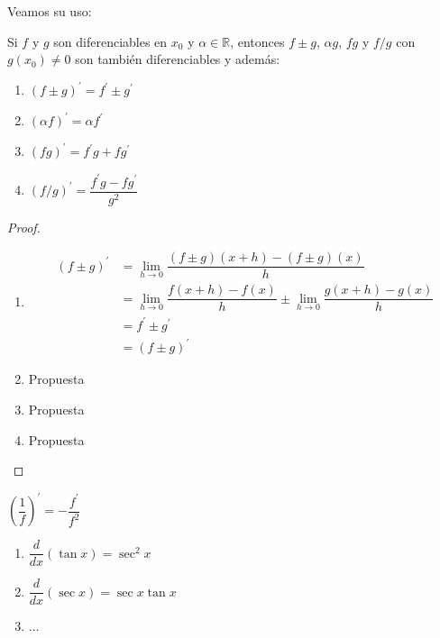 Veamos su uso:

\begin{thm}
    Si $f$ y $g$ son diferenciables en $x_0$ y $\alpha \in \mathbb{R}$, entonces $f \pm g$, $\alpha g$, $fg$ y $f/g$ con $g(x_0) \neq 0$ son también diferenciables y además:

    \begin{enumerate}
        \item $(f \pm g)^\prime = f^\prime \pm g^\prime$
        \item $(\alpha f)^\prime = \alpha f^\prime$
        \item $(fg)^\prime = f^\prime g + fg^\prime$
        \item $(f/g)^\prime = \dfrac{f^\prime g - fg^\prime}{g^2}$
    \end{enumerate}
\end{thm}

\begin{proof}
    \begin{enumerate}
        \item 
        \begin{align*}
            (f \pm g)^\prime & = \lim_{h \to 0} \dfrac{(f \pm g)(x+h)-(f \pm g)(x)}{h} \\
            & = \lim_{h \to 0} \dfrac{f(x+h)-f(x)}{h} \pm \lim_{h \to 0} \dfrac{g(x+h)-g(x)}{h} \\
            & = f^\prime \pm g^\prime \\
            & = (f \pm g)^\prime 
        \end{align*}
        \item Propuesta
        \item Propuesta
        \item Propuesta
    \end{enumerate}
\end{proof}

\begin{cor}
    $\left(\dfrac{1}{f}\right)^\prime = -\dfrac{f^\prime}{f^2}$
\end{cor}

\begin{exs}\leavevmode
    \begin{enumerate}
        \item $\dfrac{d}{dx}(\tan{x}) = \sec^2{x}$
        \item $\dfrac{d}{dx}(\sec{x}) = \sec{x}\tan{x}$
        \item $\dots$
    \end{enumerate}
\end{exs}

